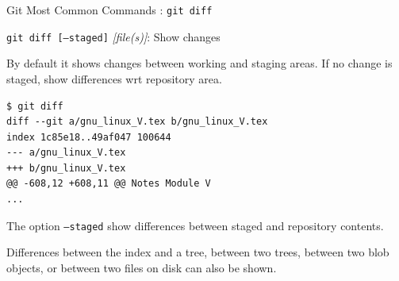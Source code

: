 \begin{frame}[t,fragile]{Git Most Common Commands : \alert{\texttt{git diff}}}
      \begin{block}{\alert{\texttt{git diff [--staged]} \emph{[file(s)]}}: Show changes}
        {\scriptsize
          By default it shows changes between \alert{working} and \alert{staging} areas. If no change is staged, show differences wrt \alert{repository} area.
          \begin{lstlisting}
$ git diff
diff --git a/gnu_linux_V.tex b/gnu_linux_V.tex
index 1c85e18..49af047 100644
--- a/gnu_linux_V.tex
+++ b/gnu_linux_V.tex
@@ -608,12 +608,11 @@ Notes Module V
...
\end{lstlisting}
The option \alert{\texttt{--staged}} show differences between staged and repository contents.

Differences between the index and a tree, between two trees, between two blob objects, or between two files on disk can also be shown.}      
\end{block}  
  
\end{frame}
